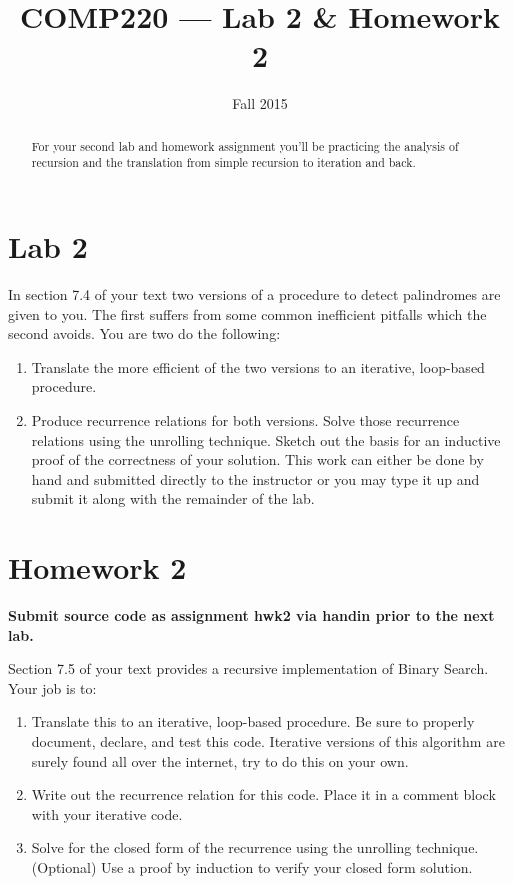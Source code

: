 \documentclass[10pt]{article}
\title{COMP220 --- Lab 2 \& Homework 2}
\author{ }
\date{Fall 2015}
\begin{document}
\maketitle

\begin{abstract}
  For your second lab and homework assignment you'll be practicing the analysis of recursion and the translation from simple recursion to iteration and back.
\end{abstract}

\section{Lab 2}

In section 7.4 of your text two versions of a procedure to detect palindromes are given to you. The first suffers from some common inefficient pitfalls which the second avoids.  You are two do the following:
\begin{enumerate}
  \item Translate the more efficient of the two versions to an iterative, loop-based procedure.
  \item Produce recurrence relations for both versions. Solve those recurrence relations using the unrolling technique. Sketch out the basis for an inductive proof of the correctness of your solution. This work can either be done by hand and submitted directly to the instructor or you may type it up and submit it along with the remainder of the lab.

\end{enumerate}

\section{Homework 2}

\begin{center}
  \textbf{Submit source code as assignment hwk2 via handin prior to the next lab.}
\end{center}

Section 7.5 of your text provides a recursive implementation of Binary Search. Your job is to:
\begin{enumerate}
  \item Translate this to an iterative, loop-based procedure. Be sure to properly document, declare, and test this code. Iterative versions of this algorithm are surely found all over the internet, try to do this on your own.
  \item Write out the recurrence relation for this code. Place it in a comment block with your iterative code.
  \item Solve for the closed form of the recurrence using the unrolling technique. (Optional) Use a proof by induction to verify your closed form solution.
\end{enumerate}
\end{document}
